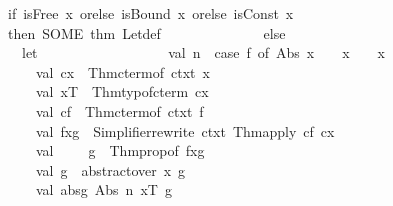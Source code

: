 \begin{isabellebody}
\ \ \ \ \ \ \ \ \ \ \ \ \ \ if\ is{\isacharunderscore}{\kern0pt}Free\ x\ orelse\ is{\isacharunderscore}{\kern0pt}Bound\ x\ orelse\ is{\isacharunderscore}{\kern0pt}Const\ x\isanewline
\ \ \ \ \ \ \ \ \ \ \ \ \ \ then\ SOME\ {\isacharat}{\kern0pt}{\isacharbraceleft}{\kern0pt}thm\ Let{\isacharunderscore}{\kern0pt}def{\isacharbraceright}{\kern0pt}\isanewline
\ \ \ \ \ \ \ \ \ \ \ \ \ \ else\isanewline
\ \ \ \ \ \ \ \ \ \ \ \ \ \ \ \ let\isanewline
\ \ \ \ \ \ \ \ \ \ \ \ \ \ \ \ \ \ val\ n\ {\isacharequal}{\kern0pt}\ case\ f\ of\ {\isacharparenleft}{\kern0pt}Abs\ {\isacharparenleft}{\kern0pt}x{\isacharcomma}{\kern0pt}\ {\isacharunderscore}{\kern0pt}{\isacharcomma}{\kern0pt}\ {\isacharunderscore}{\kern0pt}{\isacharparenright}{\kern0pt}{\isacharparenright}{\kern0pt}\ {\isacharequal}{\kern0pt}{\isachargreater}{\kern0pt}\ x\ {\isacharbar}{\kern0pt}\ {\isacharunderscore}{\kern0pt}\ {\isacharequal}{\kern0pt}{\isachargreater}{\kern0pt}\ {\isachardoublequote}{\kern0pt}x{\isachardoublequote}{\kern0pt}{\isacharsemicolon}{\kern0pt}\isanewline
\ \ \ \ \ \ \ \ \ \ \ \ \ \ \ \ \ \ val\ cx\ {\isacharequal}{\kern0pt}\ Thm{\isachardot}{\kern0pt}cterm{\isacharunderscore}{\kern0pt}of\ ctxt\ x{\isacharsemicolon}{\kern0pt}\isanewline
\ \ \ \ \ \ \ \ \ \ \ \ \ \ \ \ \ \ val\ xT\ {\isacharequal}{\kern0pt}\ Thm{\isachardot}{\kern0pt}typ{\isacharunderscore}{\kern0pt}of{\isacharunderscore}{\kern0pt}cterm\ cx{\isacharsemicolon}{\kern0pt}\isanewline
\ \ \ \ \ \ \ \ \ \ \ \ \ \ \ \ \ \ val\ cf\ {\isacharequal}{\kern0pt}\ Thm{\isachardot}{\kern0pt}cterm{\isacharunderscore}{\kern0pt}of\ ctxt\ f{\isacharsemicolon}{\kern0pt}\isanewline
\ \ \ \ \ \ \ \ \ \ \ \ \ \ \ \ \ \ val\ fx{\isacharunderscore}{\kern0pt}g\ {\isacharequal}{\kern0pt}\ Simplifier{\isachardot}{\kern0pt}rewrite\ ctxt\ {\isacharparenleft}{\kern0pt}Thm{\isachardot}{\kern0pt}apply\ cf\ cx{\isacharparenright}{\kern0pt}{\isacharsemicolon}{\kern0pt}\isanewline
\ \ \ \ \ \ \ \ \ \ \ \ \ \ \ \ \ \ val\ {\isacharparenleft}{\kern0pt}{\isacharunderscore}{\kern0pt}\ {\isachardollar}{\kern0pt}\ {\isacharunderscore}{\kern0pt}\ {\isachardollar}{\kern0pt}\ g{\isacharparenright}{\kern0pt}\ {\isacharequal}{\kern0pt}\ Thm{\isachardot}{\kern0pt}prop{\isacharunderscore}{\kern0pt}of\ fx{\isacharunderscore}{\kern0pt}g{\isacharsemicolon}{\kern0pt}\isanewline
\ \ \ \ \ \ \ \ \ \ \ \ \ \ \ \ \ \ val\ g{\isacharprime}{\kern0pt}\ {\isacharequal}{\kern0pt}\ abstract{\isacharunderscore}{\kern0pt}over\ {\isacharparenleft}{\kern0pt}x{\isacharcomma}{\kern0pt}\ g{\isacharparenright}{\kern0pt}{\isacharsemicolon}{\kern0pt}\isanewline
\ \ \ \ \ \ \ \ \ \ \ \ \ \ \ \ \ \ val\ abs{\isacharunderscore}{\kern0pt}g{\isacharprime}{\kern0pt}{\isacharequal}{\kern0pt}\ Abs\ {\isacharparenleft}{\kern0pt}n{\isacharcomma}{\kern0pt}\ xT{\isacharcomma}{\kern0pt}\ g{\isacharprime}{\kern0pt}{\isacharparenright}{\kern0pt}{\isacharsemicolon}{\kern0pt}\isanewline

\end{isabellebody}
